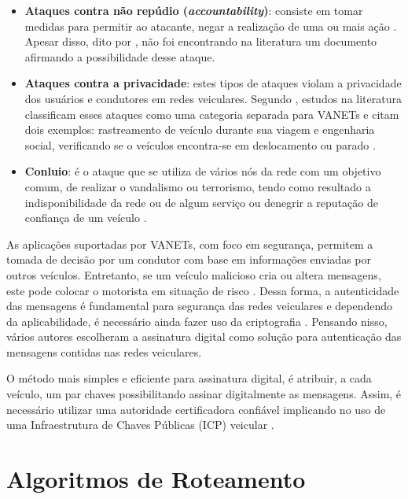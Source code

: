 \documentclass[
	12pt,				%
	oneside,			%
	a4paper,			%
	english,			%
	brazil				%
	]{abntex2ppgsi}
\begin{document}
\begin{itemize}
	
	\item {\textbf{Ataques contra não repúdio (\textit{accountability})}: consiste em tomar medidas para permitir ao atacante, negar a realização de uma ou mais ação \cite{wanghamsegurancca}. Apesar disso, dito por , não foi encontrando na literatura um documento afirmando a possibilidade desse ataque.}
	
	\item {\textbf{Ataques contra a privacidade}: estes tipos de ataques violam a privacidade dos usuários e condutores em redes veiculares. Segundo }, estudos na literatura classificam esses ataques como uma categoria separada para VANETs e citam dois exemplos: rastreamento de veículo durante sua viagem e engenharia social, verificando se o veículos encontra-se em deslocamento ou parado \cite{mejri2014survey}.
	
	\item {\textbf{Conluio}: é o ataque que se utiliza de vários nós da rede com um objetivo comum, de realizar o vandalismo ou terrorismo, tendo como resultado a indisponibilidade da rede  ou de algum serviço ou denegrir a reputação de confiança de um veículo \cite{zhang2011survey}.}
	
\end{itemize}

As aplicações suportadas por VANETs, com foco em segurança, permitem a tomada de decisão por um condutor com base em informações enviadas por outros veículos. Entretanto, se um veículo malicioso cria ou altera mensagens, este pode colocar o motorista em situação de risco \cite{wasef2010complementing}. Dessa forma, a autenticidade das mensagens é fundamental para segurança das redes veiculares e dependendo da aplicabilidade, é necessário ainda fazer uso da criptografia \cite{wanghamsegurancca}. Pensando nisso, vários autores \cite{raya2006securing} \cite{mejri2014survey} escolheram a assinatura digital como solução para autenticação das mensagens contidas nas redes veiculares. 

O método mais simples e eficiente para assinatura digital, é atribuir, a cada veículo, um par chaves possibilitando assinar digitalmente as mensagens. Assim, é necessário utilizar uma autoridade certificadora confiável implicando no uso de uma Infraestrutura  de Chaves Públicas (ICP) veicular \cite{wasef2010complementing}.

\section{Algoritmos de Roteamento}
\end{document}
